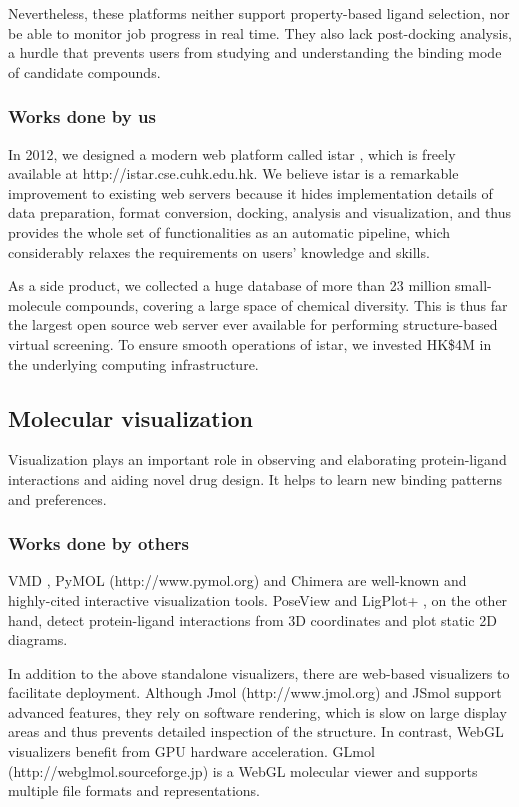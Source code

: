 \documentclass[a4paper,12pt]{article}
\begin{document}
Nevertheless, these platforms neither support property-based ligand selection, nor be able to monitor job progress in real time. They also lack post-docking analysis, a hurdle that prevents users from studying and understanding the binding mode of candidate compounds.

\subsubsection*{Works done by us}

In 2012, we designed a modern web platform called istar \cite{1362}, which is freely available at http://istar.cse.cuhk.edu.hk. We believe istar is a remarkable improvement to existing web servers because it hides implementation details of data preparation, format conversion, docking, analysis and visualization, and thus provides the whole set of functionalities as an automatic pipeline, which considerably relaxes the requirements on users' knowledge and skills.

As a side product, we collected a huge database of more than 23 million small-molecule compounds, covering a large space of chemical diversity. This is thus far the largest open source web server ever available for performing structure-based virtual screening. To ensure smooth operations of istar, we invested HK\$4M in the underlying computing infrastructure.

\subsection*{Molecular visualization}

Visualization plays an important role in observing and elaborating protein-ligand interactions and aiding novel drug design. It helps to learn new binding patterns and preferences.

\subsubsection*{Works done by others}

VMD \citep{1220}, PyMOL (http://www.pymol.org) and Chimera \citep{1219} are well-known and highly-cited interactive visualization tools. PoseView \citep{748} and LigPlot+ \citep{951}, on the other hand, detect protein-ligand interactions from 3D coordinates and plot static 2D diagrams.

In addition to the above standalone visualizers, there are web-based visualizers to facilitate deployment. Although Jmol (http://www.jmol.org) and JSmol \citep{1314} support advanced features, they rely on software rendering, which is slow on large display areas and thus prevents detailed inspection of the structure. In contrast, WebGL visualizers benefit from GPU hardware acceleration. GLmol (http://webglmol.sourceforge.jp) is a WebGL molecular viewer and supports multiple file formats and representations.
\end{document}
